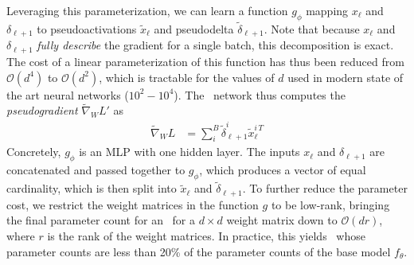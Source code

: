 \documentclass{article}
\begin{document}
Leveraging this parameterization, we can learn a function $g_\phi$ mapping $x_\ell$ and $\delta_{\ell+1}$ to pseudoactivations $\tilde x_\ell$ and pseudodelta $\tilde\delta_{\ell+1}$. Note that because $x_\ell$ and $\delta_{\ell+1}$ \textit{fully describe} the gradient for a single batch, this decomposition is exact. The cost of a linear parameterization of this function has thus been reduced from $\mathcal{O}(d^4)$ to $\mathcal{O}(d^2)$, which is tractable for the values of $d$ used in modern state of the art neural networks ($10^2-10^4$). The \name~network thus computes the \textit{pseudogradient} $\tilde{\nabla}_W L'$ as
\begin{align}
    \tilde{\nabla}_W L &= \sum_i^B\tilde\delta_{\ell + 1}^{i}{\tilde x_\ell^{i\,T}}
\end{align}
Concretely, $g_\phi$ is an MLP with one hidden layer. The inputs $x_\ell$ and $\delta_{\ell+1}$ are concatenated and passed together to $g_\phi$, which produces a vector of equal cardinality, which is then split into $\tilde x_\ell$ and $\tilde \delta_{\ell+1}$. To further reduce the parameter cost, we restrict the weight matrices in the function $g$ to be low-rank, bringing the final parameter count for an \name~for a $d \times d$ weight matrix down to $\mathcal{O}(dr)$, where $r$ is the rank of the weight matrices. In practice, this yields \name~whose parameter counts are less than 20\% of the parameter counts of the base model $f_\theta$.

\end{document}
